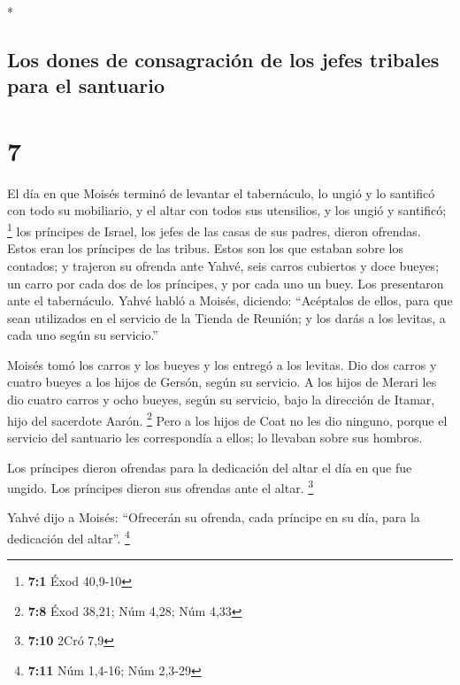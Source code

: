 \begin{paracol}{2}
\begin{otherlanguage}{english}
\end{otherlanguage}

\switchcolumn[0]*

\hypertarget{los-dones-de-consagraciuxf3n-de-los-jefes-tribales-para-el-santuario}{%
\subsection{Los dones de consagración de los jefes tribales para el
santuario}\label{los-dones-de-consagraciuxf3n-de-los-jefes-tribales-para-el-santuario}}

\hypertarget{section-12}{%
\section{7}\label{section-12}}

 El día en que Moisés terminó de levantar el tabernáculo,
lo ungió y lo santificó con todo su mobiliario, y el altar con todos sus
utensilios, y los ungió y santificó; \footnote{\textbf{7:1} Éxod 40,9-10}
 los príncipes de Israel, los jefes de las casas de sus
padres, dieron ofrendas. Estos eran los príncipes de las tribus. Estos
son los que estaban sobre los contados;  y trajeron su
ofrenda ante Yahvé, seis carros cubiertos y doce bueyes; un carro por
cada dos de los príncipes, y por cada uno un buey. Los presentaron ante
el tabernáculo.  Yahvé habló a Moisés, diciendo:
 ``Acéptalos de ellos, para que sean utilizados en el
servicio de la Tienda de Reunión; y los darás a los levitas, a cada uno
según su servicio.''

 Moisés tomó los carros y los bueyes y los entregó a los
levitas.  Dio dos carros y cuatro bueyes a los hijos de
Gersón, según su servicio.  A los hijos de Merari les dio
cuatro carros y ocho bueyes, según su servicio, bajo la dirección de
Itamar, hijo del sacerdote Aarón. \footnote{\textbf{7:8} Éxod 38,21; Núm
  4,28; Núm 4,33}  Pero a los hijos de Coat no les dio
ninguno, porque el servicio del santuario les correspondía a ellos; lo
llevaban sobre sus hombros.

 Los príncipes dieron ofrendas para la dedicación del
altar el día en que fue ungido. Los príncipes dieron sus ofrendas ante
el altar. \footnote{\textbf{7:10} 2Cró 7,9}

 Yahvé dijo a Moisés: ``Ofrecerán su ofrenda, cada
príncipe en su día, para la dedicación del altar''. \footnote{\textbf{7:11}
  Núm 1,4-16; Núm 2,3-29}


\end{paracol}
